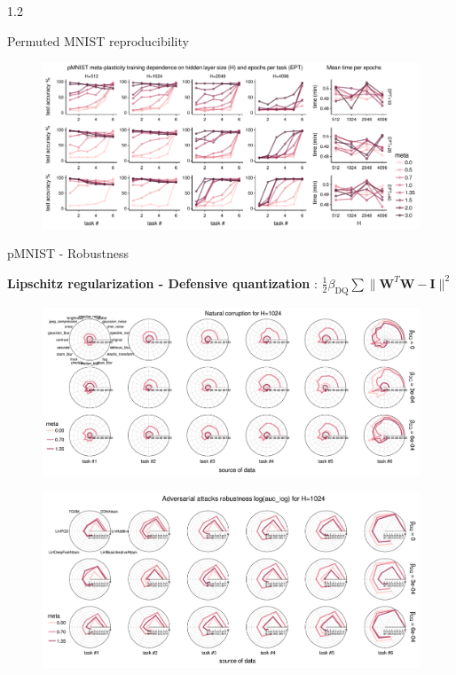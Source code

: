 \documentclass[aspectratio=32, final]{beamer}
\newlength{\colwidth}
\begin{document}
\begin{frame}[t]
\begin{columns}[t]
\begin{column}{1.2\colwidth}
\begin{block}{Permuted MNIST reproducibility}
    \begin{figure}
        \includegraphics[width=1.2\colwidth]{figures/reproduce.pdf}
    \end{figure}
  \end{block}

  \begin{block}{pMNIST - Robustness}
  
    \textbf{Lipschitz regularization - Defensive quantization} \cite{Lin2019-xs}: $\frac{1}{2}\beta_{\mathrm{DQ}}\sum \lVert \mathbf{W}^T\mathbf{W} - \mathbf{I} \rVert^2$
    
    \begin{figure}
        \centering
        \includegraphics[width=1.1\colwidth]{figures/pmnist-natcorpt.pdf}
    \end{figure}

    \begin{figure}
        \centering
        \includegraphics[width=1.1\colwidth]{figures/pmnist-advattck.pdf}
    \end{figure}
    

\end{block}
\end{column}
\end{columns}
\end{frame}
\end{document}
